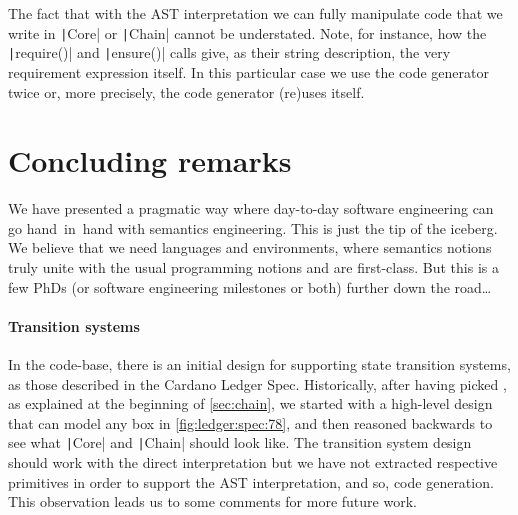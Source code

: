 \documentclass[11pt]{article}
\newcommand{\ScalaI}[1]{\texttt|#1|}
\begin{document}
The fact that with the AST interpretation we can fully manipulate code that 
we write in \ScalaI{Core} or \ScalaI{Chain} cannot be understated. Note, for 
instance, how the \ScalaI{require()} and \ScalaI{ensure()} calls give, as 
their string description, the very requirement expression itself. In this 
particular case we use the code generator twice or, more precisely, the code 
generator (re)uses itself.


\section{Concluding remarks}
\label{sec:conclusions}
We have presented a pragmatic way where day-to-day software engineering can 
go hand~in~hand with semantics engineering. This is just the tip of the 
iceberg. We believe that we need languages and environments, where semantics 
notions truly unite with the usual programming notions and are first-class. 
But this is a few PhDs (or software engineering milestones or both) further 
down the road\dots

\paragraph*{Transition systems} In the code-base, there is an 
initial design for supporting state transition systems, as those described in 
the Cardano Ledger Spec. Historically, after having picked 
, as explained at the beginning of \autoref{sec:chain}, 
we started with a high-level design that can model any box in 
\autoref{fig:ledger:spec:78}, and then reasoned backwards to see what 
\ScalaI{Core} and \ScalaI{Chain} should look like. The transition system 
design should work with the direct interpretation but we have not extracted 
respective primitives in order to support the AST interpretation, and so, 
code generation. This observation leads us to some comments for more future 
work.
\end{document}

